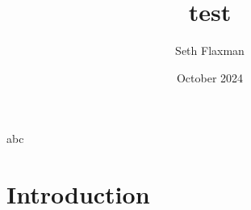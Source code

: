\documentclass{article}
\title{test}
\author{Seth Flaxman}
\date{October 2024}
\begin{document}
\maketitle
abc
\section{Introduction}
\end{document}
